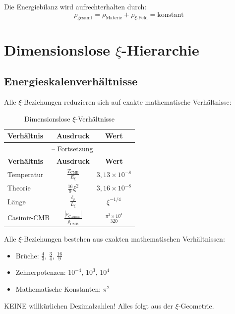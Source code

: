 	Die Energiebilanz wird aufrechterhalten durch:
	\begin{equation}
		\rho_{\text{gesamt}} = \rho_{\text{Materie}} + \rho_{\xi\text{-Feld}} = \text{konstant}
	\end{equation}
	
	\section{Dimensionslose $\xi$-Hierarchie}
	
	\subsection{Energieskalenverhältnisse}
	
	Alle $\xi$-Beziehungen reduzieren sich auf exakte mathematische Verhältnisse:
	
	\begin{longtable}{lcc}
		\caption{Dimensionslose $\xi$-Verhältnisse} \\
		\toprule
		\textbf{Verhältnis} & \textbf{Ausdruck} & \textbf{Wert} \\
		\midrule
		\endfirsthead
		\multicolumn{3}{c}{\tablename\ \thetable{} -- Fortsetzung} \\
		\toprule
		\textbf{Verhältnis} & \textbf{Ausdruck} & \textbf{Wert} \\
		\midrule
		\endhead
		Temperatur & $\frac{T_{\text{CMB}}}{E_\xi}$ & $3{,}13 \times 10^{-8}$ \\
		Theorie & $\frac{16}{9}\xi^2$ & $3{,}16 \times 10^{-8}$ \\
		Länge & $\frac{\ell_{\xi}}{L_\xi}$ & $\xi^{-1/4}$ \\
		Casimir-CMB & $\frac{|\rho_{\text{Casimir}}|}{\rho_{\text{CMB}}}$ & $\frac{\pi^2 \times 10^4}{320}$ \\
		\bottomrule
	\end{longtable}
	
	\begin{important}
		Alle $\xi$-Beziehungen bestehen aus exakten mathematischen Verhältnissen:
		\begin{itemize}
			\item Brüche: $\frac{4}{3}$, $\frac{3}{4}$, $\frac{16}{9}$
			\item Zehnerpotenzen: $10^{-4}$, $10^3$, $10^4$
			\item Mathematische Konstanten: $\pi^2$
		\end{itemize}
		KEINE willkürlichen Dezimalzahlen! Alles folgt aus der $\xi$-Geometrie.
	\end{important}
	
